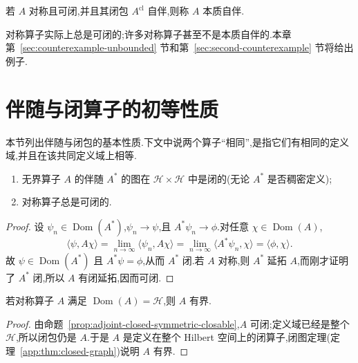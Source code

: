 \begin{definition}[本质自伴算子]\label{def:essentially-selfadjoint}
若 \(A\) 对称且可闭,并且其闭包 \(A^{\mathrm{cl}}\) 自伴,则称 \(A\) 本质自伴.
\end{definition}

对称算子实际上总是可闭的;许多对称算子甚至不是本质自伴的.本章第~\ref{sec:counterexample-unbounded} 节和第~\ref{sec:second-counterexample} 节将给出例子.

\section{伴随与闭算子的初等性质}
\label{sec:elementary-unbounded-properties}

本节列出伴随与闭包的基本性质.下文中说两个算子“相同”,是指它们有相同的定义域,并且在该共同定义域上相等.

\begin{proposition}[伴随的闭性与对称算子的可闭性]\label{prop:adjoint-closed-symmetric-closable}
\begin{enumerate}
\item 无界算子 \(A\) 的伴随 \(A^{*}\) 的图在 \(\mathcal{H}\times\mathcal{H}\) 中是闭的(无论 \(A^{*}\) 是否稠密定义);
\item 对称算子总是可闭的.
\end{enumerate}
\end{proposition}

\begin{proof}
设 \(\psi_{n}\in\operatorname{Dom}(A^{*})\),\(\psi_{n}\to\psi\),且 \(A^{*}\psi_{n}\to\phi\).对任意 \(\chi\in\operatorname{Dom}(A)\),
\[
\langle\psi,A\chi\rangle
=\lim_{n\to\infty}\langle\psi_{n},A\chi\rangle
=\lim_{n\to\infty}\langle A^{*}\psi_{n},\chi\rangle
=\langle\phi,\chi\rangle.
\]
故 \(\psi\in\operatorname{Dom}(A^{*})\) 且 \(A^{*}\psi=\phi\),从而 \(A^{*}\) 闭.若 \(A\) 对称,则 \(A^{*}\) 延拓 \(A\),而刚才证明了 \(A^{*}\) 闭,所以 \(A\) 有闭延拓,因而可闭.
\end{proof}

\begin{corollary}[处处定义的对称算子有界]\label{cor:everywhere-defined-symmetric-bounded}
若对称算子 \(A\) 满足 \(\operatorname{Dom}(A)=\mathcal{H}\),则 \(A\) 有界.
\end{corollary}

\begin{proof}
由命题~\ref{prop:adjoint-closed-symmetric-closable},\(A\) 可闭;定义域已经是整个 \(\mathcal{H}\),所以闭包仍是 \(A\).于是 \(A\) 是定义在整个 Hilbert 空间上的闭算子,闭图定理(定理~\ref{app:thm:closed-graph})说明 \(A\) 有界.
\end{proof}

